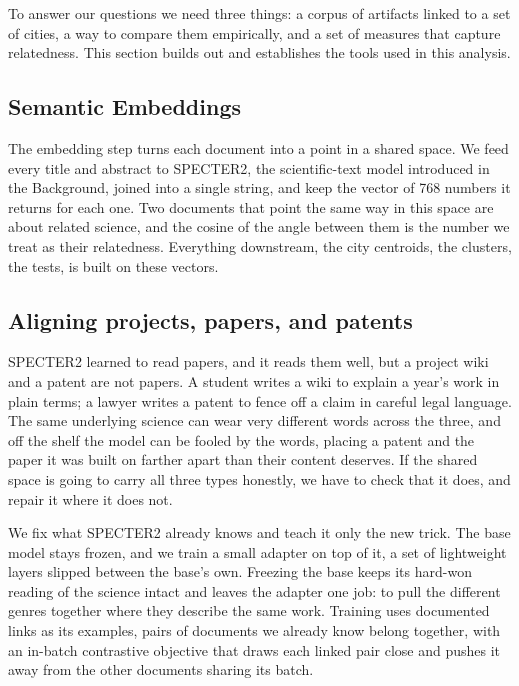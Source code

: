 \documentclass[12pt,a4paper]{article}
\begin{document}
	To answer our questions we need three things: a corpus of artifacts linked to a set of cities, a way to compare them empirically, and a set of measures that capture relatedness. This section builds out and establishes the tools used in this analysis.
	

	
	\subsection{Semantic Embeddings}
	
	
	The embedding step turns each document into a point in a shared space. We feed every title and abstract to SPECTER2, the scientific-text model introduced in the Background, joined into a single string, and keep the vector of 768 numbers it returns for each one. Two documents that point the same way in this space are about related science, and the cosine of the angle between them is the number we treat as their relatedness. Everything downstream, the city centroids, the clusters, the tests, is built on these vectors.

	\subsection{Aligning projects, papers, and patents}

	SPECTER2 learned to read papers, and it reads them well, but a project wiki and a patent are not papers. A student writes a wiki to explain a year's work in plain terms; a lawyer writes a patent to fence off a claim in careful legal language. The same underlying science can wear very different words across the three, and off the shelf the model can be fooled by the words, placing a patent and the paper it was built on farther apart than their content deserves. If the shared space is going to carry all three types honestly, we have to check that it does, and repair it where it does not.

	We fix what SPECTER2 already knows and teach it only the new trick. The base model stays frozen, and we train a small adapter on top of it, a set of lightweight layers slipped between the base's own. Freezing the base keeps its hard-won reading of the science intact and leaves the adapter one job: to pull the different genres together where they describe the same work. Training uses documented links as its examples, pairs of documents we already know belong together, with an in-batch contrastive objective that draws each linked pair close and pushes it away from the other documents sharing its batch.
\end{document}
